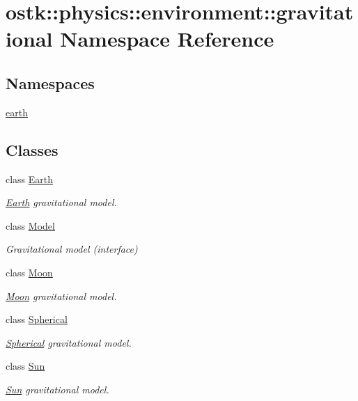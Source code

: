 \hypertarget{namespaceostk_1_1physics_1_1environment_1_1gravitational}{}\section{ostk\+:\+:physics\+:\+:environment\+:\+:gravitational Namespace Reference}
\label{namespaceostk_1_1physics_1_1environment_1_1gravitational}
\subsection*{Namespaces}
\begin{DoxyCompactItemize}
\item 
 \hyperlink{namespaceostk_1_1physics_1_1environment_1_1gravitational_1_1earth}{earth}
\end{DoxyCompactItemize}
\subsection*{Classes}
\begin{DoxyCompactItemize}
\item 
class \hyperlink{classostk_1_1physics_1_1environment_1_1gravitational_1_1_earth}{Earth}
\begin{DoxyCompactList}\small\item\em \hyperlink{classostk_1_1physics_1_1environment_1_1gravitational_1_1_earth}{Earth} gravitational model. \end{DoxyCompactList}\item 
class \hyperlink{classostk_1_1physics_1_1environment_1_1gravitational_1_1_model}{Model}
\begin{DoxyCompactList}\small\item\em Gravitational model (interface) \end{DoxyCompactList}\item 
class \hyperlink{classostk_1_1physics_1_1environment_1_1gravitational_1_1_moon}{Moon}
\begin{DoxyCompactList}\small\item\em \hyperlink{classostk_1_1physics_1_1environment_1_1gravitational_1_1_moon}{Moon} gravitational model. \end{DoxyCompactList}\item 
class \hyperlink{classostk_1_1physics_1_1environment_1_1gravitational_1_1_spherical}{Spherical}
\begin{DoxyCompactList}\small\item\em \hyperlink{classostk_1_1physics_1_1environment_1_1gravitational_1_1_spherical}{Spherical} gravitational model. \end{DoxyCompactList}\item 
class \hyperlink{classostk_1_1physics_1_1environment_1_1gravitational_1_1_sun}{Sun}
\begin{DoxyCompactList}\small\item\em \hyperlink{classostk_1_1physics_1_1environment_1_1gravitational_1_1_sun}{Sun} gravitational model. \end{DoxyCompactList}\end{DoxyCompactItemize}
